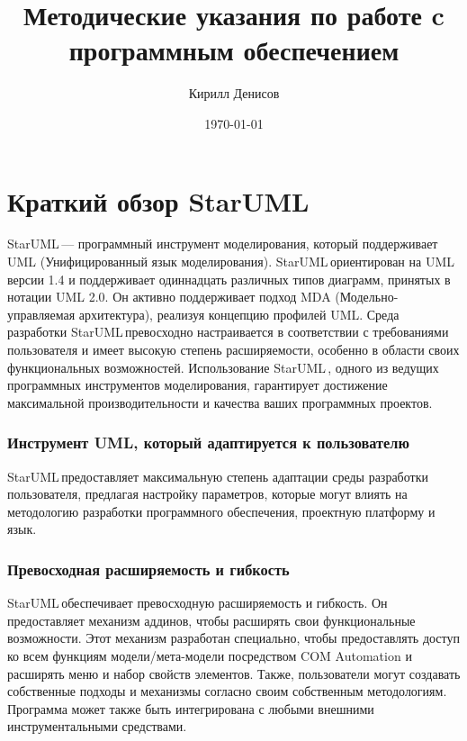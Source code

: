 \documentclass[a4paper,12pt]{report}
\author{Кирилл Денисов}
\title{Методические указания по работе c программным обеспечением \staruml}
\date{\today}
\newcommand{\pathToCommonFolder}{../../Common}
\newcommand{\staruml}{StarUML\,\tm}
\begin{document}
\maketitle
\newpage

	
	\newpage
	\tableofcontents
	\newpage

	
	\newpage
	
	
\chapter{Краткий обзор \staruml}

\staruml --- программный инструмент моделирования, который поддерживает UML
(Унифицированный язык моделирования). \staruml ориентирован на UML версии 1.4 и
поддерживает одиннадцать различных типов диаграмм, принятых в нотации UML 2.0. Он активно
поддерживает подход MDA (Модельно-управляемая архитектура), реализуя концепцию профилей
UML. Среда разработки \staruml превосходно настраивается в соответствии с требованиями
пользователя и имеет высокую степень расширяемости, особенно в области своих
функциональных возможностей. Использование \staruml, одного из ведущих программных
инструментов моделирования, гарантирует достижение максимальной производительности и
качества ваших программных проектов.
\subsection*{Инструмент UML, который адаптируется к пользователю}
\staruml  предоставляет максимальную степень адаптации среды разработки пользователя,
предлагая настройку параметров, которые могут влиять на методологию разработки программного
обеспечения, проектную платформу и язык.

\subsection*{Превосходная расширяемость и гибкость}
\staruml  обеспечивает превосходную расширяемость и гибкость. Он предоставляет механизм
аддинов, чтобы расширять свои функциональные возможности. Этот механизм разработан
специально, чтобы предоставлять доступ ко всем функциям модели/мета-модели посредством
COM Automation и расширять меню и набор свойств элементов. Также, пользователи могут
создавать собственные подходы и механизмы согласно своим собственным методологиям.
Программа может также быть интегрирована с любыми внешними инструментальными
средствами.
\end{document}
